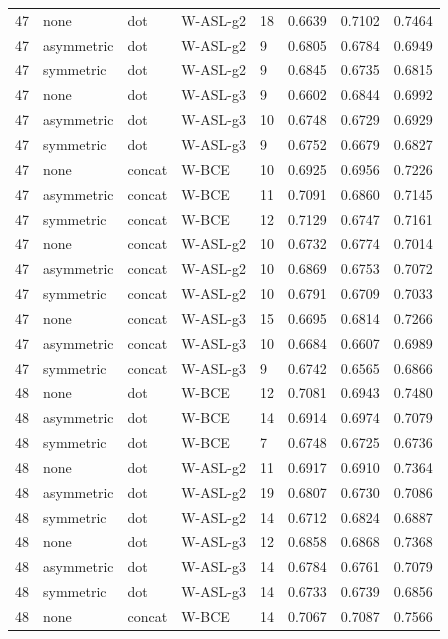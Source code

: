 \begin{longtable}{rllllrrr}
47 & none & dot & W-ASL-g2 & 18 & 0.6639 & 0.7102 & 0.7464 \\
47 & asymmetric & dot & W-ASL-g2 & 9 & 0.6805 & 0.6784 & 0.6949 \\
47 & symmetric & dot & W-ASL-g2 & 9 & 0.6845 & 0.6735 & 0.6815 \\
47 & none & dot & W-ASL-g3 & 9 & 0.6602 & 0.6844 & 0.6992 \\
47 & asymmetric & dot & W-ASL-g3 & 10 & 0.6748 & 0.6729 & 0.6929 \\
47 & symmetric & dot & W-ASL-g3 & 9 & 0.6752 & 0.6679 & 0.6827 \\
47 & none & concat & W-BCE & 10 & 0.6925 & 0.6956 & 0.7226 \\
47 & asymmetric & concat & W-BCE & 11 & 0.7091 & 0.6860 & 0.7145 \\
47 & symmetric & concat & W-BCE & 12 & 0.7129 & 0.6747 & 0.7161 \\
47 & none & concat & W-ASL-g2 & 10 & 0.6732 & 0.6774 & 0.7014 \\
47 & asymmetric & concat & W-ASL-g2 & 10 & 0.6869 & 0.6753 & 0.7072 \\
47 & symmetric & concat & W-ASL-g2 & 10 & 0.6791 & 0.6709 & 0.7033 \\
47 & none & concat & W-ASL-g3 & 15 & 0.6695 & 0.6814 & 0.7266 \\
47 & asymmetric & concat & W-ASL-g3 & 10 & 0.6684 & 0.6607 & 0.6989 \\
47 & symmetric & concat & W-ASL-g3 & 9 & 0.6742 & 0.6565 & 0.6866 \\
48 & none & dot & W-BCE & 12 & 0.7081 & 0.6943 & 0.7480 \\
48 & asymmetric & dot & W-BCE & 14 & 0.6914 & 0.6974 & 0.7079 \\
48 & symmetric & dot & W-BCE & 7 & 0.6748 & 0.6725 & 0.6736 \\
48 & none & dot & W-ASL-g2 & 11 & 0.6917 & 0.6910 & 0.7364 \\
48 & asymmetric & dot & W-ASL-g2 & 19 & 0.6807 & 0.6730 & 0.7086 \\
48 & symmetric & dot & W-ASL-g2 & 14 & 0.6712 & 0.6824 & 0.6887 \\
48 & none & dot & W-ASL-g3 & 12 & 0.6858 & 0.6868 & 0.7368 \\
48 & asymmetric & dot & W-ASL-g3 & 14 & 0.6784 & 0.6761 & 0.7079 \\
48 & symmetric & dot & W-ASL-g3 & 14 & 0.6733 & 0.6739 & 0.6856 \\
48 & none & concat & W-BCE & 14 & 0.7067 & 0.7087 & 0.7566 \\

\end{longtable}
